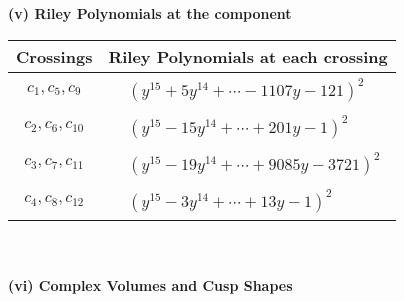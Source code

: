 \documentclass[1p]{elsarticle_modified}
\theoremstyle{definition}
\begin{document}
\newpage\renewcommand{\arraystretch}{1}
\flushleft \textbf{(v) Riley Polynomials at the component}\newline \\
\begin{tabular}{m{50pt}|m{274pt}}
Crossings & \hspace{64pt}Riley Polynomials at each crossing \\
\hline $$\begin{aligned}c_{1},c_{5},c_{9}\end{aligned}$$&$\begin{aligned}
&(y^{15}+5 y^{14}+\cdots-1107 y-121)^{2}
\end{aligned}$\\
\hline $$\begin{aligned}c_{2},c_{6},c_{10}\end{aligned}$$&$\begin{aligned}
&(y^{15}-15 y^{14}+\cdots+201 y-1)^{2}
\end{aligned}$\\
\hline $$\begin{aligned}c_{3},c_{7},c_{11}\end{aligned}$$&$\begin{aligned}
&(y^{15}-19 y^{14}+\cdots+9085 y-3721)^{2}
\end{aligned}$\\
\hline $$\begin{aligned}c_{4},c_{8},c_{12}\end{aligned}$$&$\begin{aligned}
&(y^{15}-3 y^{14}+\cdots+13 y-1)^{2}
\end{aligned}$\\
\hline
\end{tabular}\\~\\
\newpage\flushleft \textbf{(vi) Complex Volumes and Cusp Shapes}
\end{document}
